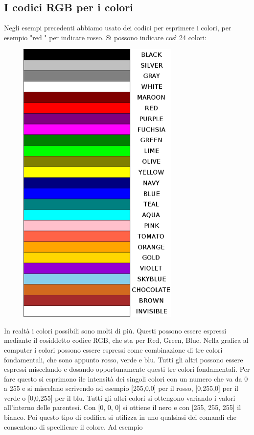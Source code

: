 \subsection{I codici RGB per i colori}

Negli esempi precedenti abbiamo usato dei codici per esprimere i colori, per
esempio  "red " per indicare rosso. Si possono indicare così 24 colori: 

\vskip 1cm

\begin{figure}[H]
   \centering
   \includegraphics[width=8.0cm,trim=4 4 8 4,clip]{./images/disegnare/disegnare-16.png}
   \label{dis-16-a}
\end{figure}

In realtà i colori possibili sono molti di più. Questi possono essere espressi mediante il cosiddetto codice RGB, che sta per Red, Green, Blue. Nella grafica al computer i colori possono essere espressi come combinazione di tre colori fondamentali, che sono appunto rosso, verde e blu. Tutti gli altri possono essere espressi miscelando e dosando opportunamente questi tre colori fondamentali. Per fare questo si esprimono ile intensità dei singoli colori con un numero che va da 0 a 255 e si miscelano scrivendo ad esempio [255,0,0] per il rosso, [0,255,0] per il verde o [0,0,255] per il blu. Tutti gli altri colori si ottengono variando i valori all'interno delle parentesi. Con [0, 0, 0]  si ottiene il nero e con [255, 255, 255] il bianco. Poi questo tipo di codifica si utilizza in uno qualsiasi dei comandi che consentono di specificare il colore. Ad esempio

